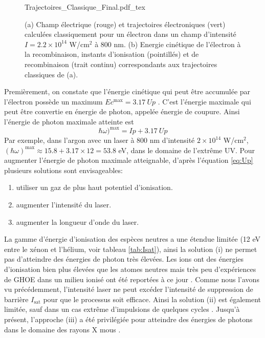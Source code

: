 \begin{figure}
\centering
\def\svgwidth{0.6\columnwidth}
{Trajectoires_Classique_Final.pdf_tex}
\caption{(a) Champ électrique (rouge) et trajectoires électroniques (vert) calculées classiquement pour un électron dans un champ d'intensité $I = 2.2 \times 10^{14}$  W/cm$^2$ à 800 nm. (b) Energie cinétique de l'électron à la recombinaison, instants d'ionisation (pointillés) et de recombinaison (trait continu) correspondants aux trajectoires classiques de (a).}
\label{fig:traj_class}
\end{figure}

Premièrement, on constate que l'énergie cinétique qui peut être accumulée par l'électron possède un maximum $Ec^{\text{max}} = 3.17 \: Up$ . C'est l'énergie maximale qui peut être convertie en énergie de photon, appelée énergie de coupure. Ainsi l'énergie de photon maximale atteinte est
\begin{equation}
\hbar \omega)^{\text{max}} = Ip + 3.17 \: Up
\label{eq:LoiCoupure}
\end{equation}
Par exemple, dans l'argon avec un laser à 800 nm d'intensité $2 \times 10^{14}$ W/cm$^2$, $(\hbar \omega)^{\text{max}} \approx 15.8 + 3.17 \times 12 = 53.8$ eV, dans le domaine de l'extrême UV. Pour augmenter l'énergie de photon maximale atteignable, d'après l'équation \ref{eq:Up} plusieurs solutions sont envisageables:
\begin{enumerate}[label=\roman*)]
\item utiliser un gaz de plus haut potentiel d'ionisation.
\item augmenter l'intensité du laser.
\item augmenter la longueur d'onde du laser.
\end{enumerate}
La gamme d'énergie d'ionisation des espèces neutres a une étendue limitée (12 eV entre le xénon et l'hélium, voir tableau \ref{tab:Isat}), ainsi la solution (i) ne permet pas d'atteindre des énergies de photon très élevées. Les ions ont des énergies d'ionisation bien plus élevées que les atomes neutres mais très peu d'expériences de GHOE dans un milieu ionisé ont été reportées à ce jour . Comme nous l'avons vu précédemment, l'intensité laser ne peut excéder l'intensité de suppression de barrière $I_{\text{sat}}$ pour que le processus soit efficace. Ainsi la solution (ii) est également limitée, sauf dans un cas extrême d'impulsions de quelques cycles . Jusqu'à présent, l'approche (iii) a été privilégiée pour atteindre des énergies de photons dans le domaine des rayons X mous .

